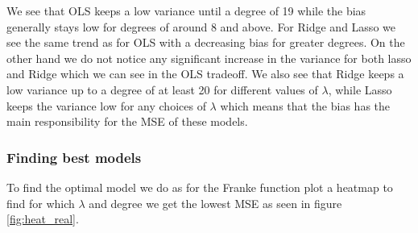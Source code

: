 \documentclass[12pt]{article}
\begin{document}
We see that OLS keeps a low variance until a degree of 19 while the bias generally stays low for degrees of around 8 and above. For Ridge and Lasso we see the same trend as for OLS with a decreasing bias for greater degrees. On the other hand we do not notice any significant increase in the variance for both lasso and Ridge which we can see in the OLS tradeoff. We also see that Ridge keeps a low variance up to a degree of at least 20 for different values of $\lambda$, while Lasso keeps the variance low for any choices of $\lambda$ which means that the bias has the main responsibility for the MSE of these models.

\subsubsection{Finding best models}
To find the optimal model we do as for the Franke function plot a heatmap to find for which $\lambda$ and degree we get the lowest MSE as seen in figure \ref{fig:heat_real}.
\end{document}
